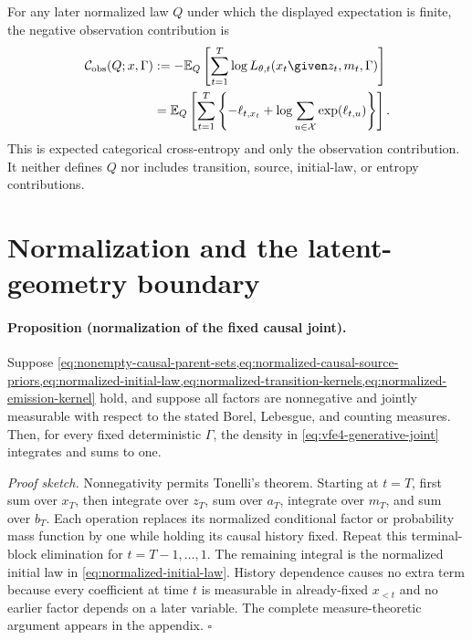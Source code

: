For any later normalized law $Q$ under which the displayed expectation is finite, the negative observation contribution is
\begin{equation}
\begin{aligned}
\mathcal C_{\mathrm{obs}}(Q;x,\Gamma)
&:=-\mathbb E_Q\left[
\sum_{t=1}^T\log L_{\theta,t}(x_t\given z_t,m_t,\Gamma)
\right]\\
&=\mathbb E_Q\left[
\sum_{t=1}^T
\left\{-\ell_{t,x_t}+\log\sum_{u\in\mathcal X}\exp(\ell_{t,u})\right\}
\right].
\end{aligned}
\label{eq:expected-categorical-cross-entropy}
\end{equation}
This is expected categorical cross-entropy and only the observation contribution.  It neither defines $Q$ nor includes transition, source, initial-law, or entropy contributions.

\section{Normalization and the latent-geometry boundary}

\paragraph{Proposition (normalization of the fixed causal joint).}
Suppose \cref{eq:nonempty-causal-parent-sets,eq:normalized-causal-source-priors,eq:normalized-initial-law,eq:normalized-transition-kernels,eq:normalized-emission-kernel} hold, and suppose all factors are nonnegative and jointly measurable with respect to the stated Borel, Lebesgue, and counting measures.  Then, for every fixed deterministic $\Gamma$, the density in \cref{eq:vfe4-generative-joint} integrates and sums to one.

\emph{Proof sketch.}
Nonnegativity permits Tonelli's theorem.  Starting at $t=T$, first sum over $x_T$, then integrate over $z_T$, sum over $a_T$, integrate over $m_T$, and sum over $b_T$.  Each operation replaces its normalized conditional factor or probability mass function by one while holding its causal history fixed.  Repeat this terminal-block elimination for $t=T-1,\ldots,1$.  The remaining integral is the normalized initial law in \cref{eq:normalized-initial-law}.  History dependence causes no extra term because every coefficient at time $t$ is measurable in already-fixed $x_{<t}$ and no earlier factor depends on a later variable.  The complete measure-theoretic argument appears in the appendix.  \hfill$\square$

